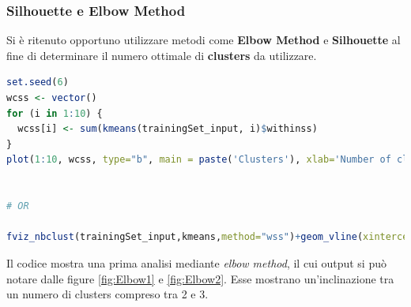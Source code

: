 \documentclass[letterpaper,11pt]{article}
\begin{document}
\subsubsection{Silhouette e Elbow Method}
Si è ritenuto opportuno utilizzare metodi come \textbf{Elbow Method} e \textbf{Silhouette} al fine di determinare il numero ottimale di \textbf{clusters} da utilizzare. 
\begin{lstlisting}[language=R]
set.seed(6)
wcss <- vector()
for (i in 1:10) {
  wcss[i] <- sum(kmeans(trainingSet_input, i)$withinss)
}
plot(1:10, wcss, type="b", main = paste('Clusters'), xlab='Number of clusters', ylab="WCSS")


# OR

fviz_nbclust(trainingSet_input,kmeans,method="wss")+geom_vline(xintercept=2,linetype=2)
\end{lstlisting}
Il codice mostra una prima analisi mediante \textit{elbow method}, il cui output si può notare dalle figure \ref{fig:Elbow1} e \ref{fig:Elbow2}. Esse mostrano un'inclinazione tra un numero di clusters compreso tra 2 e 3.
\end{document}
